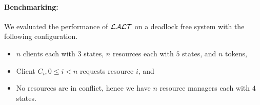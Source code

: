 
\begin{table}
\label{bench:resourceallocation}
\end{table}

\paragraph{Benchmarking:}

We evaluated the performance of $\mathcal{LALT}$ on a deadlock free system with the following configuration. 
\begin{itemize}
\item $n$ clients each with $3$ states, $n$ resources each with $5$ states, and $n$ tokens,
\item Client $C_i, 0\leq i < n$ requests resource $i$, and 
\item No resources are in conflict, hence we have $n$ resource managers each with $4$ states. 
\end{itemize}

